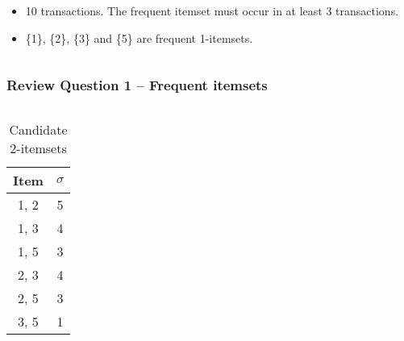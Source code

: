 \documentclass[aspectratio=169, 10pt]{beamer}
\begin{document}
\begin{frame}[t]
\begin{columns}
\begin{column}{0.5\textwidth}
        \begin{itemize}
            \item 10 transactions. The frequent itemset must occur in at least 3 transactions.
            \item \{1\}, \{2\}, \{3\} and \{5\} are frequent 1-itemsets.
        \end{itemize}
    \end{column}
\end{columns}

\end{frame}

\begin{frame}[t]
\frametitle{Review Question 1 -- Frequent itemsets}
\small

\begin{columns}
    \begin{column}{0.5\textwidth} 
        \begin{table}[]
            \begin{tabular}{c|c}
                Item                       &  $\sigma$                \\ \hline
                1, 2                       & 5                        \\
                1, 3                       & 4                        \\
                1, 5                       & 3                        \\
                2, 3                       & 4                        \\
                2, 5                       & 3                        \\
                {\color[HTML]{FE0000} 3, 5} & {\color[HTML]{FE0000} 1}
            \end{tabular}
            \caption{Candidate 2-itemsets}
        \end{table}


\end{column}
\end{columns}
\end{frame}
\end{document}
